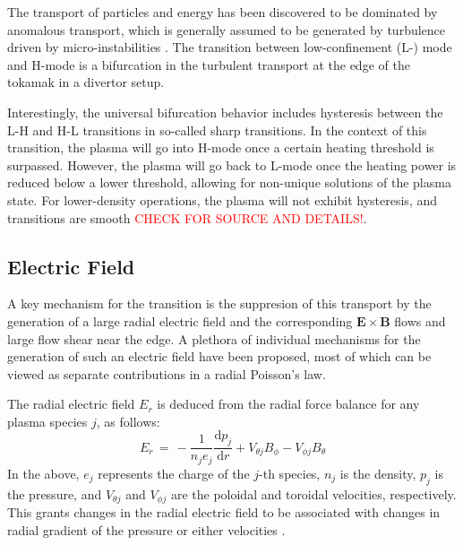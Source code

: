 \documentclass[a4paper]{article}
\newcommand\mynotes[1]{\textcolor{red}{#1}}
\begin{document}
The transport of particles and energy has been discovered to be dominated by anomalous transport, which is generally assumed to be generated by turbulence driven by micro-instabilities \cite{freidberg_plasma_2007}.
The transition between low-confinement (L-) mode and H-mode is a bifurcation in the turbulent transport at the edge of the tokamak in a divertor setup.

Interestingly, the universal bifurcation behavior includes hysteresis between the L-H and H-L transitions in so-called sharp transitions.
In the context of this transition, the plasma will go into H-mode once a certain heating threshold is surpassed.
However, the plasma will go back to L-mode once the heating power is reduced below a lower threshold, allowing for non-unique solutions of the plasma state.
For lower-density operations, the plasma will not exhibit hysteresis, and transitions are smooth \cite{weymiens_bifurcation_2014} \mynotes{CHECK FOR SOURCE AND DETAILS!}.

\subsection{Electric Field}
A key mechanism for the transition is the suppresion of this transport by the generation of a large radial electric field and the corresponding $\mathbf{E}\times\mathbf{B}$ flows and large flow shear near the edge.
A plethora of individual mechanisms for the generation of such an electric field have been proposed, most of which can be viewed as separate contributions in a radial Poisson's law.

The radial electric field $E_r$ is deduced from the radial force balance for any plasma species $j$, as follows:
\begin{equation}
	E_r \,=\, -\frac{1}{n_j e_j} \frac{\text{d} p_j}{\text{d} r} + V_{\theta j} B_\phi - V_{\phi j} B_\theta
	\label{eq:E_r}
\end{equation}
In the above, $e_j$ represents the charge of the $j$-th species, $n_j$ is the density, $p_j$ is the pressure, and $V_{\theta j}$ and $V_{\phi j}$ are the poloidal and toroidal velocities, respectively.
This grants changes in the radial electric field to be associated with changes in radial gradient of the pressure or either velocities \cite{connor_review_2000}\cite{staps_backstepping_2017}.
\end{document}
